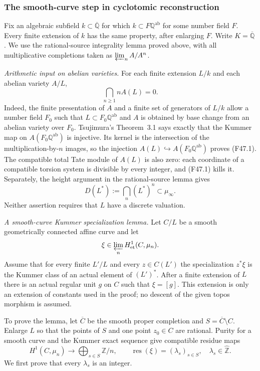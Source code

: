 \subsubsection*{The smooth-curve step in cyclotomic reconstruction}

Fix an algebraic subfield $k\subset\overline{\mathbb Q}$ for which
$k\subset F\mathbb Q^{\mathrm{ab}}$ for some number field $F$.
Every finite extension of $k$ has the same property, after enlarging
$F$. Write $K=\overline{\mathbb Q}$. We use the rational-source
integrality lemma proved above, with all multiplicative completions
taken as $\varprojlim_n A/A^n$.

\emph{Arithmetic input on abelian varieties.}
For each finite extension $L/k$ and each abelian variety $A/L$,
\[
 \bigcap_{n\geq1} nA(L)=0.                                  \tag{F47.1}
\]
Indeed, the finite presentation of $A$ and a finite set of generators
of $L/k$ allow a number field $F_0$ such that
$L\subset F_0\mathbb Q^{\mathrm{ab}}$ and $A$ is obtained by base
change from an abelian variety over $F_0$. Tsujimura's
Theorem~3.1 \cite{Tsujimura2020} says exactly that the Kummer map
on $A(F_0\mathbb Q^{\mathrm{ab}})$ is injective. Its kernel is the
intersection of the multiplication-by-$n$ images, so the injection
$A(L)\hookrightarrow A(F_0\mathbb Q^{\mathrm{ab}})$ proves
(F47.1). The compatible total Tate module of $A(L)$ is also zero:
each coordinate of a compatible torsion system is divisible by every
integer, and (F47.1) kills it. Separately, the height argument in the
rational-source lemma gives
\[
 D(L^*):=\bigcap_n(L^*)^n\subset\mu_\infty.                  \tag{F47.2}
\]
Neither assertion requires that $L$ have a discrete valuation.

\emph{A smooth-curve Kummer specialization lemma.}
Let $C/L$ be a smooth geometrically connected affine curve and let
\[
 \xi\in\varprojlim_n H^1_{\mathrm{et}}(C,\mu_n).
\]
Assume that for every finite $L'/L$ and every $z\in C(L')$ the
specialization $z^*\xi$ is the Kummer class of an actual element of
$(L')^*$. After a finite extension of $L$ there is an actual regular
unit $g$ on $C$ such that $\xi=[g]$. This extension is only an
extension of constants used in the proof; no descent of the given
topos morphism is assumed.

To prove the lemma, let $\overline C$ be the smooth proper completion
and $S=\overline C\setminus C$. Enlarge $L$ so that the points of
$S$ and one point $z_0\in C$ are rational. Purity for a smooth curve
and the Kummer exact sequence give compatible residue maps
\[
 H^1(C,\mu_n)\longrightarrow
       \bigoplus_{s\in S}\mathbb Z/n,
 \qquad
 \operatorname{res}(\xi)=(\lambda_s)_{s\in S},
 \quad\lambda_s\in\widehat{\mathbb Z}.                    \tag{F47.3}
\]
We first prove that every $\lambda_s$ is an integer.

